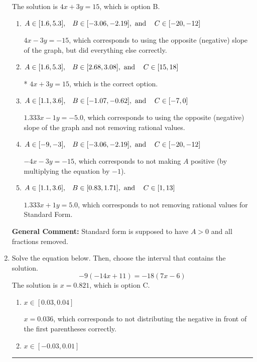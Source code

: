 \documentclass{extbook}[14pt]
\newcommand{\litem}[1]{\item #1

\rule{\textwidth}{0.4pt}}
\begin{document}
\begin{enumerate}
{The solution is \( 4x + 3y = 15 \), which is option B.\begin{enumerate}[label=\Alph*.]
\item \( A \in [1.6, 5.3], \hspace{3mm} B \in [-3.06, -2.19], \text{ and } \hspace{3mm} C \in [-20, -12] \)

 $4x - 3y = -15$, which corresponds to using the opposite (negative) slope of the graph, but did everything else correctly.
\item \( A \in [1.6, 5.3], \hspace{3mm} B \in [2.68, 3.08], \text{ and } \hspace{3mm} C \in [15, 18] \)

* $4x + 3y = 15$, which is the correct option.
\item \( A \in [1.1, 3.6], \hspace{3mm} B \in [-1.07, -0.62], \text{ and } \hspace{3mm} C \in [-7, 0] \)

 $1.333x - 1y = -5.0$, which corresponds to using the opposite (negative) slope of the graph and not removing rational values.
\item \( A \in [-9, -3], \hspace{3mm} B \in [-3.06, -2.19], \text{ and } \hspace{3mm} C \in [-20, -12] \)

 $-4x - 3y = -15$, which corresponds to not making $A$ positive (by multiplying the equation by $-1$).
\item \( A \in [1.1, 3.6], \hspace{3mm} B \in [0.83, 1.71], \text{ and } \hspace{3mm} C \in [1, 13] \)

 $1.333x + 1y = 5.0$, which corresponds to not removing rational values for Standard Form.
\end{enumerate}

\textbf{General Comment:} Standard form is supposed to have $A > 0$ and all fractions removed.
}
\litem{
Solve the equation below. Then, choose the interval that contains the solution.
\[ -9(-14x + 11) = -18(7x -6) \]The solution is \( x = 0.821 \), which is option C.\begin{enumerate}[label=\Alph*.]
\item \( x \in [0.03, 0.04] \)

$x = 0.036$, which corresponds to not distributing the negative in front of the first parentheses correctly.
\item \( x \in [-0.03, 0.01] \)


\end{enumerate}}
\end{enumerate}
\end{document}
